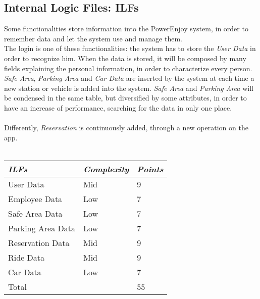 \documentclass[11pt,a4paper]{report}
\begin{document}
\subsection{Internal Logic Files: ILFs}
Some functionalities store information into the PowerEnjoy system, in order to remember data and let the system use and manage them.\\
The login is one of these functionalities: the system has to store the \textit{User Data} in order to recognize him. When the data is stored, it will be composed by many fields explaining the personal information, in order to characterize every person.\\
\textit{Safe Area}, \textit{Parking Area} and \textit{Car Data} are inserted by the system at each time a new station or vehicle is added into the system. \textit{Safe Area} and \textit{Parking Area} will be condensed in the same table, but diversified by some attributes, in order to have an increase of performance, searching for the data in only one place. \\\\
Differently, \textit{Reservation} is continuously added, through a new operation on the app.
\\\\
\begin{tabularx}{\textwidth}{|X|X|X|}
	\hline
	\textit{ILFs} & \textit{Complexity} & \textit{Points}\\
	\hline
	User Data & Mid & 9\\
	Employee Data & Low & 7\\
	Safe Area Data & Low & 7\\
	Parking Area Data & Low & 7\\
	Reservation Data & Mid & 9\\
	Ride Data & Mid & 9\\
	Car Data & Low & 7\\
	\hline
	\hline
	Total & \multicolumn{1}{X}{} & \multicolumn{1}{X|}{55}\\
	\hline
\end{tabularx}
\end{document}
